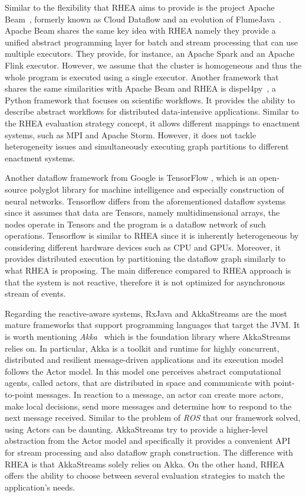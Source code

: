 \documentclass[sigplan,screen,10pt]{acmart}
\begin{document}
Similar to the flexibility that \textsc{RHEA} aims to provide is the project
Apache Beam~\cite{beam}, formerly known as Cloud Dataflow and an evolution of FlumeJava~\cite{flumejava}.
Apache Beam shares the same key idea with \textsc{RHEA} namely they provide a
unified abstract programming layer for batch and stream processing that can use
multiple executors. They provide, for instance, an Apache Spark and an Apache Flink
executor. However, we assume that the cluster is homogeneous and thus the whole
program is executed using a single executor. Another framework that shares the
same similarities with Apache Beam and RHEA is dispel4py~\cite{dispel4py}, a Python
framework that focuses on scientific workflows. It provides the ability
to describe abstract workflows for distributed data-intensive applications.
Similar to the \textsc{RHEA} evaluation strategy concept, it allows different mappings
to enactment systems, such as MPI and Apache Storm. However, it does not tackle
heterogeneity issues and simultaneously executing graph partitions to different
enactment systems.

Another dataflow framework from Google is TensorFlow \cite{tensorflow},
which is an open-source polyglot library for machine intelligence and especially
construction of neural networks. Tensorflow differs from the aforementioned dataflow
systems since it assumes that data are Tensors, namely multidimensional arrays,
the nodes operate in Tensors and the program is a dataflow network of such operations.
Tensorflow is similar to \textsc{RHEA} since it is inherently heterogeneous by
considering different hardware devices such as CPU and GPUs. Moreover, it provides
distributed execution by partitioning the dataflow graph similarly to what \textsc{RHEA}
is proposing. The main difference compared to \textsc{RHEA} approach is that the
system is not reactive, therefore it is not optimized for asynchronous stream of
events.

Regarding the reactive-aware systems, RxJava and AkkaStreams are the most mature
frameworks that support programming languages that target the JVM. It is worth
mentioning \textit{Akka}~ which is the foundation library
where AkkaStreams relies on. In particular, Akka is a toolkit and runtime for highly
concurrent, distributed and resilient message-driven applications and its execution
model follows the Actor model. In this model one perceives abstract computational
agents, called actors, that are distributed in space and communicate with
point-to-point messages. In reaction to a message, an actor can create more actors,
make local decisions, send more messages and determine how to respond to the next
message received. Similar to the problem of \textit{ROS} that our framework solved,
using Actors can be daunting. AkkaStreams try to provide a higher-level abstraction
from the Actor model and specifically it provides a convenient API for stream
processing and also dataflow graph construction.
The difference with \textsc{RHEA} is that AkkaStreams solely relies on Akka. On the
other hand, \textsc{RHEA} offers the ability to choose between several
evaluation strategies to match the application's needs.
\end{document}
